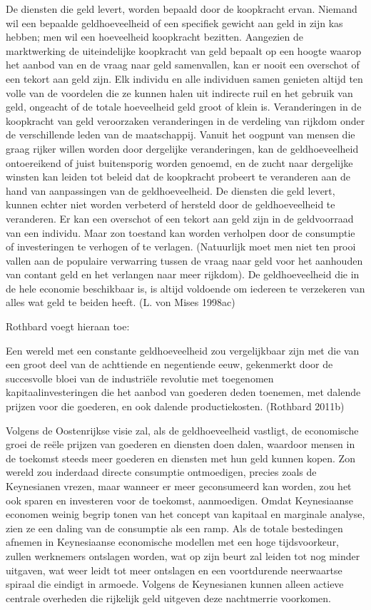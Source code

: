 \documentclass[
  a5paper,
  smalldemyvopaper,11pt,twoside,onecolumn,openright,extrafontsizes,
hidelinks]{memoir}
\begin{document}
De diensten die geld levert, worden bepaald door de koopkracht ervan.
Niemand wil een bepaalde geldhoeveelheid of een specifiek gewicht aan
geld in zijn kas hebben; men wil een hoeveelheid koopkracht bezitten.
Aangezien de marktwerking de uiteindelijke koopkracht van geld bepaalt
op een hoogte waarop het aanbod van en de vraag naar geld samenvallen,
kan er nooit een overschot of een tekort aan geld zijn. Elk individu en
alle individuen samen genieten altijd ten volle van de voordelen die ze
kunnen halen uit indirecte ruil en het gebruik van geld, ongeacht of de
totale hoeveelheid geld groot of klein is. Veranderingen in de
koopkracht van geld veroorzaken veranderingen in de verdeling van
rijkdom onder de verschillende leden van de maatschappij. Vanuit het
oogpunt van mensen die graag rijker willen worden door dergelijke
veranderingen, kan de geldhoeveelheid ontoereikend of juist buitensporig
worden genoemd, en de zucht naar dergelijke winsten kan leiden tot
beleid dat de koopkracht probeert te veranderen aan de hand van
aanpassingen van de geldhoeveelheid. De diensten die geld levert, kunnen
echter niet worden verbeterd of hersteld door de geldhoeveelheid te
veranderen. Er kan een overschot of een tekort aan geld zijn in de
geldvoorraad van een individu. Maar zon toestand kan worden verholpen
door de consumptie of investeringen te verhogen of te verlagen.
(Natuurlijk moet men niet ten prooi vallen aan de populaire verwarring
tussen de vraag naar geld voor het aanhouden van contant geld en het
verlangen naar meer rijkdom). De geldhoeveelheid die in de hele economie
beschikbaar is, is altijd voldoende om iedereen te verzekeren van alles
wat geld te beiden heeft. (L. von Mises 1998ac)

Rothbard voegt hieraan toe:

Een wereld met een constante geldhoeveelheid zou vergelijkbaar zijn met
die van een groot deel van de achttiende en negentiende eeuw, gekenmerkt
door de succesvolle bloei van de industriële revolutie met toegenomen
kapitaalinvesteringen die het aanbod van goederen deden toenemen, met
dalende prijzen voor die goederen, en ook dalende productiekosten.
(Rothbard 2011b)

Volgens de Oostenrijkse visie zal, als de geldhoeveelheid vastligt, de
economische groei de reële prijzen van goederen en diensten doen dalen,
waardoor mensen in de toekomst steeds meer goederen en diensten met hun
geld kunnen kopen. Zon wereld zou inderdaad directe consumptie
ontmoedigen, precies zoals de Keynesianen vrezen, maar wanneer er meer
geconsumeerd kan worden, zou het ook sparen en investeren voor de
toekomst, aanmoedigen. Omdat Keynesiaanse economen weinig begrip tonen
van het concept van kapitaal en marginale analyse, zien ze een daling
van de consumptie als een ramp. Als de totale bestedingen afnemen in
Keynesiaanse economische modellen met een hoge tijdsvoorkeur, zullen
werknemers ontslagen worden, wat op zijn beurt zal leiden tot nog minder
uitgaven, wat weer leidt tot meer ontslagen en een voortdurende
neerwaartse spiraal die eindigt in armoede. Volgens de Keynesianen
kunnen alleen actieve centrale overheden die rijkelijk geld uitgeven
deze nachtmerrie voorkomen.
\end{document}
